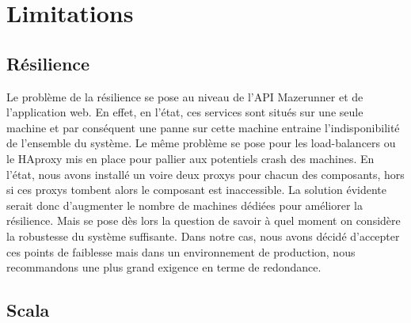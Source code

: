 \section{Limitations}

\subsection{Résilience}

Le problème de la résilience se pose au niveau de l'API Mazerunner et de l'application web. En effet, en l'état, ces services sont situés sur une seule machine et par conséquent une panne sur cette machine entraine l'indisponibilité de l'ensemble du système.
Le même problème se pose pour les load-balancers ou le HAproxy mis en place pour pallier aux potentiels crash des machines. 
En l'état, nous avons installé un voire deux proxys pour chacun des composants, hors si ces proxys tombent alors le composant est inaccessible. 
La solution évidente serait donc d'augmenter le nombre de machines dédiées pour améliorer la résilience. Mais se pose dès lors la question de savoir à quel moment on considère la robustesse du système suffisante. 
Dans notre cas, nous avons décidé d'accepter ces points de faiblesse mais dans un environnement de production, nous recommandons une plus grand exigence en terme de redondance.

\subsection{Scala}


